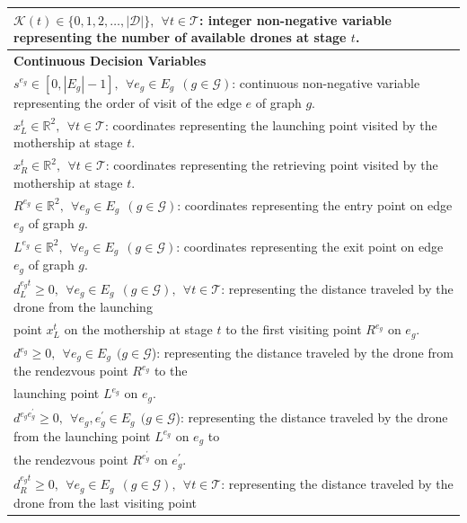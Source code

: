 \documentclass[10pt,a4paper]{elsarticle}
\newcommand{\EN}[1]{{\color{black}#1}}
\begin{document}
\begin{table}[h!]
\begin{tabular}{|l|}
$\mathcal{K}(t) \in \{0, 1, 2, \ldots, |\mathcal D|\}, \:\: \forall t \in \mathcal T$: integer non-negative variable representing the number of available drones at stage $t$.\\
\hline
\textbf{Continuous Decision Variables}\\
\hline
$s^{e_g}\in [0, |E_g|-1], \:\: \forall e_g \in E_g\:\: (g \in \mathcal{G})$: continuous non\EN{-}negative variable representing the order of visit of the edge $e$ of graph $g$.\\
$x_L^t\in\mathbb R^2, \:\: \forall t \in \mathcal T$: coordinates representing the launching point visited by the mothership at stage $t$.\\
$x_R^t\in\mathbb R^2, \:\: \forall t \in \mathcal T$: coordinates representing the retrieving point visited by the mothership at stage $t$.\\
$R^{e_g}\in\mathbb R^2, \:\: \forall e_g \in E_g\:\: (g \in \mathcal{G})$: coordinates representing the entry point on edge $e_g$ of graph $g$.\\
$L^{e_g}\in\mathbb R^2, \:\: \forall e_g \in E_g\:\: (g \in \mathcal{G})$: coordinates representing the exit point on edge $e_g$ of graph $g$.\\
$d_L^{e_g t} \geq 0, \:\: \forall e_g \in E_g \:\: (g \in \mathcal{G}), \:\:\forall t \in \mathcal T$: representing the distance traveled by the drone from the launching\\
\hspace*{1cm} point $x_L^t$ on the mothership at stage $t$ to the first visiting point $R^{e_g}$ on $e_g$.\\
$d^{e_g} \geq 0, \:\: \forall e_g \in E_g\:\: (g \in \mathcal{G}$): representing the distance traveled by the drone from the rendezvous point $R^{e_g}$ to the \\
\hspace*{1cm} launching point $L^{e_g}$ on $e_g$. \\
$d^{e_ge^\prime_g} \geq 0, \:\: \forall e_g, e^\prime_g \in E_g \:\: (g \in \mathcal{G}$): representing the distance traveled by the drone from the launching point $L^{e_g}$ on $e_g$ to\\
\hspace*{1cm}  the rendezvous point $R^{e^\prime_g}$ on $e^\prime_g$.\\
$d_R^{e_g t} \geq 0, \:\: \forall e_g \in E_g\:\: (g \in \mathcal{G}), \:\:\forall t \in \mathcal T$: representing the distance traveled by the drone from the last visiting point\\

\end{tabular}
\end{table}
\end{document}
